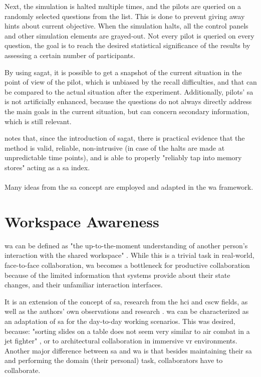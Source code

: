 Next, the simulation is halted multiple times, and the pilots are queried on a randomly selected questions from the list. This is done to prevent giving away hints about current objective. When the simulation halts, all the control panels and other simulation elements are grayed-out. Not every pilot is queried on every question, the goal is to reach the desired statistical significance of the results by assessing a certain number of participants.

By using \gls{sagat}, it is possible to get a snapshot of the current situation in the point of view of the pilot, which is unbiased by the recall difficulties, and that can be compared to the actual situation after the experiment. Additionally, pilots' \gls{sa} is not artificially enhanced, because the questions do not always directly address the main goals in the current situation, but can concern secondary information, which is still relevant.

\cite{endsley_direct_nodate} notes that, since the introduction of \gls{sagat}, there is practical evidence that the method is valid, reliable, non-intrusive (in case of the halts are made at unpredictable time points), and is able to properly "reliably tap into memory stores" acting as a \gls{sa} index. 


\paragraph[Bridge]{}
Many ideas from the \gls{sa} concept are employed and adapted in the \gls{wa} framework.


\section{Workspace Awareness}
\gls{wa} can be defined as "the up-to-the-moment understanding of another person’s interaction with the shared workspace" \cite{gutwin_descriptive_2002}. While this is a trivial task in real-world, face-to-face collaboration, \gls{wa} becomes a bottleneck for productive collaboration because of the limited information that systems provide about their state changes, and their unfamiliar interaction interfaces.
 
It is an extension of the concept of \gls{sa}, research from the \gls{hci} and \gls{cscw} fields, as well as the authors' own observations and research \cite{gutwin_descriptive_2002}. \gls{wa} can be characterized as an adaptation of \gls{sa} for the day-to-day working scenarios. This was desired, because: "sorting slides on a table does not seem very similar to air combat in a jet fighter" \cite{gutwin_descriptive_2002}, or to architectural collaboration in immersive \gls{vr} environments. Another major difference between \gls{sa} and \gls{wa} is that besides maintaining their \gls{sa} and performing the domain (their personal) task, collaborators have to collaborate.

